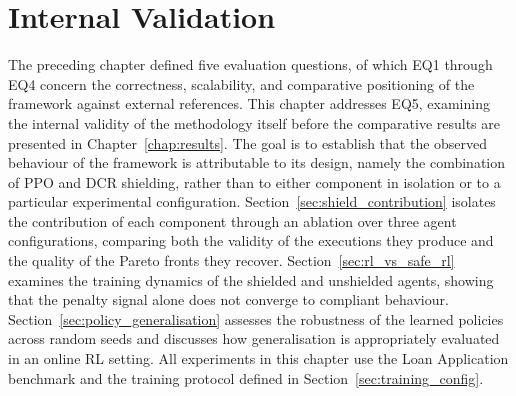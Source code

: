 
\chapter{Internal Validation}
\label{chap:internal_validation}

The preceding chapter defined five evaluation questions, of which EQ1
through EQ4 concern the correctness, scalability, and comparative
positioning of the framework against external references. This chapter
addresses EQ5, examining the internal validity of the methodology itself
before the comparative results are presented in
Chapter~\ref{chap:results}. The goal is to establish that the observed
behaviour of the framework is attributable to its design, namely the
combination of \ac{PPO} and \ac{DCR} shielding, rather than to either
component in isolation or to a particular experimental configuration.
Section~\ref{sec:shield_contribution} isolates the contribution of each
component through an ablation over three agent configurations, comparing
both the validity of the executions they produce and the quality of the
Pareto fronts they recover. Section~\ref{sec:rl_vs_safe_rl} examines the
training dynamics of the shielded and unshielded agents, showing that
the penalty signal alone does not converge to compliant behaviour.
Section~\ref{sec:policy_generalisation} assesses the robustness of the
learned policies across random seeds and discusses how generalisation is
appropriately evaluated in an online \ac{RL} setting. All experiments in
this chapter use the Loan Application benchmark and the training
protocol defined in Section~\ref{sec:training_config}.

